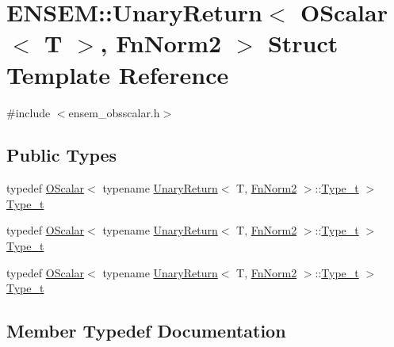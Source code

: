 \hypertarget{structENSEM_1_1UnaryReturn_3_01OScalar_3_01T_01_4_00_01FnNorm2_01_4}{}\section{E\+N\+S\+EM\+:\+:Unary\+Return$<$ O\+Scalar$<$ T $>$, Fn\+Norm2 $>$ Struct Template Reference}
\label{structENSEM_1_1UnaryReturn_3_01OScalar_3_01T_01_4_00_01FnNorm2_01_4}


{\ttfamily \#include $<$ensem\+\_\+obsscalar.\+h$>$}

\subsection*{Public Types}
\begin{DoxyCompactItemize}
\item 
typedef \mbox{\hyperlink{classENSEM_1_1OScalar}{O\+Scalar}}$<$ typename \mbox{\hyperlink{structENSEM_1_1UnaryReturn}{Unary\+Return}}$<$ T, \mbox{\hyperlink{structENSEM_1_1FnNorm2}{Fn\+Norm2}} $>$\+::\mbox{\hyperlink{structENSEM_1_1UnaryReturn_3_01OScalar_3_01T_01_4_00_01FnNorm2_01_4_ac5e99e6905d2033009638fb21f07f1be}{Type\+\_\+t}} $>$ \mbox{\hyperlink{structENSEM_1_1UnaryReturn_3_01OScalar_3_01T_01_4_00_01FnNorm2_01_4_ac5e99e6905d2033009638fb21f07f1be}{Type\+\_\+t}}
\item 
typedef \mbox{\hyperlink{classENSEM_1_1OScalar}{O\+Scalar}}$<$ typename \mbox{\hyperlink{structENSEM_1_1UnaryReturn}{Unary\+Return}}$<$ T, \mbox{\hyperlink{structENSEM_1_1FnNorm2}{Fn\+Norm2}} $>$\+::\mbox{\hyperlink{structENSEM_1_1UnaryReturn_3_01OScalar_3_01T_01_4_00_01FnNorm2_01_4_ac5e99e6905d2033009638fb21f07f1be}{Type\+\_\+t}} $>$ \mbox{\hyperlink{structENSEM_1_1UnaryReturn_3_01OScalar_3_01T_01_4_00_01FnNorm2_01_4_ac5e99e6905d2033009638fb21f07f1be}{Type\+\_\+t}}
\item 
typedef \mbox{\hyperlink{classENSEM_1_1OScalar}{O\+Scalar}}$<$ typename \mbox{\hyperlink{structENSEM_1_1UnaryReturn}{Unary\+Return}}$<$ T, \mbox{\hyperlink{structENSEM_1_1FnNorm2}{Fn\+Norm2}} $>$\+::\mbox{\hyperlink{structENSEM_1_1UnaryReturn_3_01OScalar_3_01T_01_4_00_01FnNorm2_01_4_ac5e99e6905d2033009638fb21f07f1be}{Type\+\_\+t}} $>$ \mbox{\hyperlink{structENSEM_1_1UnaryReturn_3_01OScalar_3_01T_01_4_00_01FnNorm2_01_4_ac5e99e6905d2033009638fb21f07f1be}{Type\+\_\+t}}
\end{DoxyCompactItemize}


\subsection{Member Typedef Documentation}
\mbox{\label{structENSEM_1_1UnaryReturn_3_01OScalar_3_01T_01_4_00_01FnNorm2_01_4_ac5e99e6905d2033009638fb21f07f1be}} 

